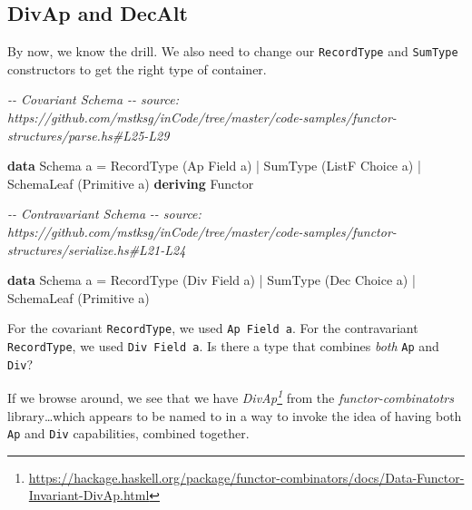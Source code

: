 \documentclass[]{article}
\newenvironment{Shaded}{}{}
\newcommand{\CommentTok}[1]{\textcolor[rgb]{0.38,0.63,0.69}{\textit{#1}}}
\newcommand{\DataTypeTok}[1]{\textcolor[rgb]{0.56,0.13,0.00}{#1}}
\newcommand{\KeywordTok}[1]{\textcolor[rgb]{0.00,0.44,0.13}{\textbf{#1}}}
\newcommand{\NormalTok}[1]{#1}
\newcommand{\OperatorTok}[1]{\textcolor[rgb]{0.40,0.40,0.40}{#1}}
\newcommand{\OtherTok}[1]{\textcolor[rgb]{0.00,0.44,0.13}{#1}}
\renewcommand{\href}[2]{#2\footnote{\url{#1}}}
\begin{document}
\subsection{DivAp and DecAlt}\label{divap-and-decalt}

By now, we know the drill. We also need to change our \texttt{RecordType} and
\texttt{SumType} constructors to get the right type of container.

\begin{Shaded}
\begin{Highlighting}[]
\CommentTok{{-}{-} Covariant Schema}
\CommentTok{{-}{-} source: https://github.com/mstksg/inCode/tree/master/code{-}samples/functor{-}structures/parse.hs\#L25{-}L29}

\KeywordTok{data} \DataTypeTok{Schema}\NormalTok{ a }\OtherTok{=}
      \DataTypeTok{RecordType}\NormalTok{  (}\DataTypeTok{Ap}    \DataTypeTok{Field}\NormalTok{  a)}
    \OperatorTok{|} \DataTypeTok{SumType}\NormalTok{     (}\DataTypeTok{ListF} \DataTypeTok{Choice}\NormalTok{ a)}
    \OperatorTok{|} \DataTypeTok{SchemaLeaf}\NormalTok{  (}\DataTypeTok{Primitive}\NormalTok{ a)}
  \KeywordTok{deriving} \DataTypeTok{Functor}
\end{Highlighting}
\end{Shaded}

\begin{Shaded}
\begin{Highlighting}[]
\CommentTok{{-}{-} Contravariant Schema}
\CommentTok{{-}{-} source: https://github.com/mstksg/inCode/tree/master/code{-}samples/functor{-}structures/serialize.hs\#L21{-}L24}

\KeywordTok{data} \DataTypeTok{Schema}\NormalTok{ a }\OtherTok{=}
      \DataTypeTok{RecordType}\NormalTok{  (}\DataTypeTok{Div} \DataTypeTok{Field}\NormalTok{  a)}
    \OperatorTok{|} \DataTypeTok{SumType}\NormalTok{     (}\DataTypeTok{Dec} \DataTypeTok{Choice}\NormalTok{ a)}
    \OperatorTok{|} \DataTypeTok{SchemaLeaf}\NormalTok{  (}\DataTypeTok{Primitive}\NormalTok{ a)}
\end{Highlighting}
\end{Shaded}

For the covariant \texttt{RecordType}, we used \texttt{Ap\ Field\ a}. For the
contravariant \texttt{RecordType}, we used \texttt{Div\ Field\ a}. Is there a
type that combines \emph{both} \texttt{Ap} and \texttt{Div}?

If we browse around, we see that we have
\emph{\href{https://hackage.haskell.org/package/functor-combinators/docs/Data-Functor-Invariant-DivAp.html}{DivAp}}
from the \emph{functor-combinatotrs} library\ldots which appears to be named to
in a way to invoke the idea of having both \texttt{Ap} and \texttt{Div}
capabilities, combined together.
\end{document}
